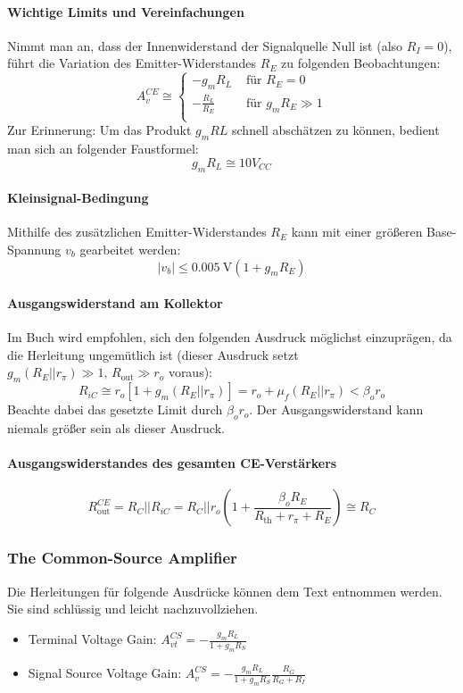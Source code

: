 \documentclass[11pt,a4paper,titlepage]{article}
\begin{document}
\paragraph{Wichtige Limits und Vereinfachungen} Nimmt man an, dass der Innenwiderstand der Signalquelle Null ist (also $R_I=0$), führt die Variation des Emitter-Widerstandes $R_E$ zu folgenden Beobachtungen:
\begin{equation} 
A_v^{CE} \cong \begin{cases} 
-g_mR_L & \mbox{ für } R_E = 0 \\
-\frac{R_L}{R_E} & \mbox{ für } g_mR_E \gg 1 \\
\end{cases}
\label{eq:AvSimplCE}
\end{equation}
Zur Erinnerung: Um das Produkt $g_mRL$ schnell abschätzen zu können, bedient man sich an folgender Faustformel:
\[ g_mR_L \cong 10V_{CC} \]
\paragraph{Kleinsignal-Bedingung} Mithilfe des zusätzlichen Emitter-Widerstandes $R_E$ kann mit einer größeren Base-Spannung $v_b$ gearbeitet werden:
\[ |v_b| \leq \SI{0.005}{\volt}(1+g_mR_E) \]
\paragraph{Ausgangswiderstand am Kollektor} Im Buch wird empfohlen, sich den folgenden Ausdruck möglichst einzuprägen, da die Herleitung ungemütlich ist (dieser Ausdruck setzt $g_m(R_E||r_{\pi}) \gg 1, \, R_{\text{out}} \gg r_o$ voraus):
\[ R_{iC} \cong r_o[1+g_m(R_E||r_{\pi})] = r_o + \mu_f(R_E||r_{\pi}) < \beta_or_o\]
Beachte dabei das gesetzte Limit durch $\beta_or_o$. Der Ausgangswiderstand kann niemals größer sein als dieser Ausdruck.
\paragraph{Ausgangswiderstandes des gesamten CE-Verstärkers}
\[ R_{\text{out}}^{CE} = R_C||R_{iC} = R_C||r_o\left(1+\frac{\beta_oR_E}{R_{\text{th}}+r_{\pi}+R_E}\right) \cong R_C \]

\subsubsection{The Common-Source Amplifier}
Die Herleitungen für folgende Ausdrücke können dem Text entnommen werden. Sie sind schlüssig und leicht nachzuvollziehen.
\begin{itemize}
	\item Terminal Voltage Gain: $A_{vt}^{CS} = - \frac{g_mR_L}{1+g_mR_S}$
	\item Signal Source Voltage Gain: $A_v^{CS} = - \frac{g_mR_L}{1+g_mR_S}\frac{R_G}{R_G + R_I}$
\end{itemize}
\end{document}
